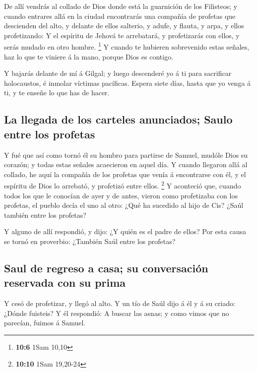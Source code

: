  De allí vendrás al collado de Dios donde está la guarnición
de los Filisteos; y cuando entrares allá en la ciudad encontrarás una
compañía de profetas que descienden del alto, y delante de ellos
salterio, y adufe, y flauta, y arpa, y ellos profetizando: 
Y el espíritu de Jehová te arrebatará, y profetizarás con ellos, y serás
mudado en otro hombre. \footnote{\textbf{10:6} 1Sam 10,10} 
Y cuando te hubieren sobrevenido estas señales, haz lo que te viniere á
la mano, porque Dios es contigo.

 Y bajarás delante de mí á Gilgal; y luego descenderé yo á
ti para sacrificar holocaustos, é inmolar víctimas pacíficas. Espera
siete días, hasta que yo venga á ti, y te enseñe lo que has de hacer.

\hypertarget{la-llegada-de-los-carteles-anunciados-saulo-entre-los-profetas}{%
\subsection{La llegada de los carteles anunciados; Saulo entre los
profetas}\label{la-llegada-de-los-carteles-anunciados-saulo-entre-los-profetas}}

 Y fué que así como tornó él su hombro para partirse de
Samuel, mudóle Dios su corazón; y todas estas señales acaecieron en
aquel día.  Y cuando llegaron allá al collado, he aquí la
compañía de los profetas que venía á encontrarse con él, y el espíritu
de Dios lo arrebató, y profetizó entre ellos. \footnote{\textbf{10:10}
  1Sam 19,20-24}  Y aconteció que, cuando todos los que le
conocían de ayer y de antes, vieron como profetizaba con los profetas,
el pueblo decía el uno al otro: ¿Qué ha sucedido al hijo de Cis? ¿Saúl
también entre los profetas?

 Y alguno de allí respondió, y dijo: ¿Y quién es el padre
de ellos? Por esta causa se tornó en proverbio: ¿También Saúl entre los
profetas?

\hypertarget{saul-de-regreso-a-casa-su-conversaciuxf3n-reservada-con-su-prima}{%
\subsection{Saul de regreso a casa; su conversación reservada con su
prima}\label{saul-de-regreso-a-casa-su-conversaciuxf3n-reservada-con-su-prima}}

 Y cesó de profetizar, y llegó al alto.  Y un
tío de Saúl dijo á él y á su criado: ¿Dónde fuisteis? Y él respondió: A
buscar las asnas; y como vimos que no parecían, fuimos á Samuel.

